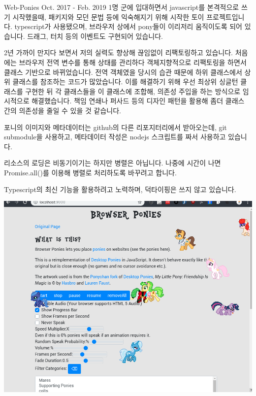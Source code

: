 \begin{cvprojects}
  \cvproject
    {Web-Ponies \href{https://github.com/palindrom615/Web-Ponies}{\faGithubSquare}} %
  	{Oct. 2017 - Feb. 2019} %
  	{1명} %
  	{
  	  군에 입대하면서 javascript를 본격적으로 쓰기 시작했을때, 패키지와 모던 문법 등에 익숙해지기 위해 시작한 토이 프로젝트입니다. typescript가 사용됐으며, 브라우저 상에서 pony들이 이리저리 움직이도록 되어 있습니다. 드래그, 터치 등의 이벤트도 구현되어 있습니다.
  	} %
  	{
  		\begin{cvitems}
  		  \item{2년 가까이 만지다 보면서 저의 실력도 향상해 끊임없이 리팩토링하고 있습니다. 처음에는 브라우저 전역 변수를 통해 상태를 관리하다 객체지향적으로 리팩토링을 하면서 클래스 기반으로 바뀌었습니다. 전역 객체였을 당시의 습관 때문에 하위 클래스에서 상위 클래스를 참조하는 코드가 많았습니다. 이를 해결하기 위해 우선 최상위 싱글턴 클래스를 구현한 뒤 각 클래스들을 이 클래스에 조합해, 의존성 주입을 하는 방식으로 임시적으로 해결했습니다. 책임 연쇄나 퍼사드 등의 디자인 패턴을 활용해 좀더 클래스 간의 의존성을 줄일 수 있을 것 같습니다.}
  		  \item{포니의 이미지와 메타데이터는 github의 다른 리포지터리에서 받아오는데, git submodule을 사용하고, 메타데이터 작성은 nodejs 스크립트를 짜서 사용하고 있습니다.}
  		  \item{리소스의 로딩은 비동기이기는 하지만 병렬은 아닙니다. 나중에 시간이 나면 Promise.all()를 이용해 병렬로 처리하도록 바꾸려고 합니다.}
   		  \item{Typescript의 최신 기능을 활용하려고 노력하며, 덕타이핑은 쓰지 않고 있습니다.}
  		\end{cvitems}
  	} %
  	{\includegraphics[width=\textwidth]{./cv/webponies}} %
  	

\end{cvprojects}

